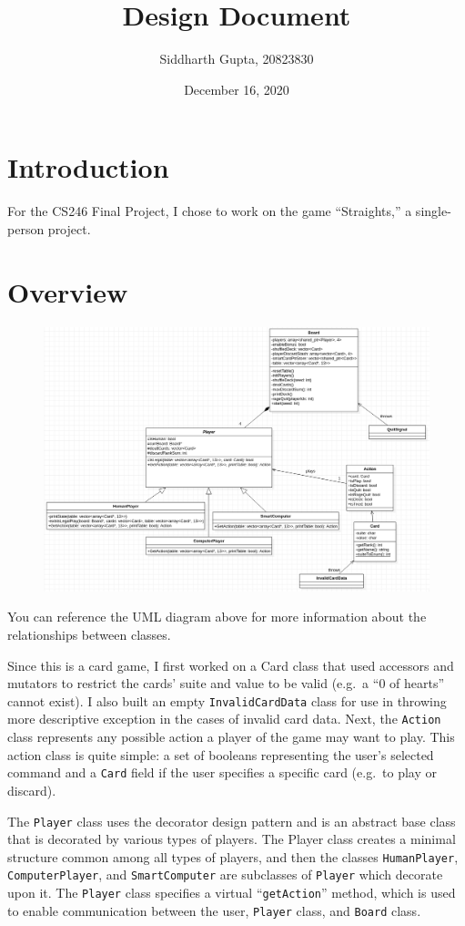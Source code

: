 \documentclass[12pt]{article}
\title{\vspace{-2cm}Design Document}
\author{Siddharth Gupta, 20823830}
\date{December 16, 2020}
\begin{document}
	\maketitle
	\section{Introduction}
		For the CS246 Final Project, I chose to work on the game ``Straights,'' a single-person project.
	\section{Overview}
		\begin{figure}[H]
			\includegraphics[width=\textwidth]{../UML/uml-final.png}
		\end{figure}
		You can reference the UML diagram above for more information about the relationships between classes.

		Since this is a card game, I first worked on a Card class that used accessors and mutators to restrict the cards' suite and value to be valid (e.g.\ a ``0 of hearts'' cannot exist). I also built an empty \texttt{InvalidCardData} class for use in throwing more descriptive exception in the cases of invalid card data.
		Next, the \texttt{Action} class represents any possible action a player of the game may want to play. This action class is quite simple: a set of booleans representing the user's selected command and a \texttt{Card} field if the user specifies a specific card (e.g.\ to play or discard).

		The \texttt{Player} class uses the decorator design pattern and is an abstract base class that is decorated by various types of players. The Player class creates a minimal structure common among all types of players, and then the classes \texttt{HumanPlayer}, \texttt{ComputerPlayer}, and \texttt{SmartComputer} are subclasses of \texttt{Player} which decorate upon it. The \texttt{Player} class specifies a virtual ``\texttt{getAction}'' method, which is used to enable communication between the user, \texttt{Player} class, and \texttt{Board} class.
\end{document}
